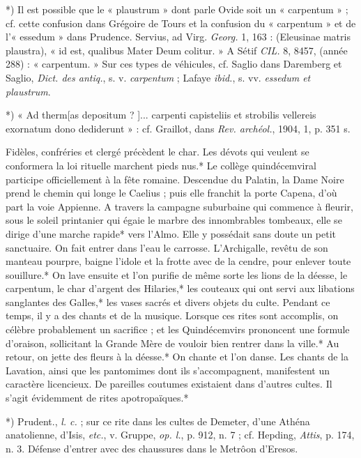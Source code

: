 \documentclass[a4paper, 11pt, oneside, polutonikogreek, french]{article}
\begin{document}
*) Il est possible que le « plaustrum » dont parle Ovide soit un « carpentum » ; cf. cette confusion dans Grégoire de Tours et la confusion du « carpentum » et de l'« essedum » dans Prudence. Servius, ad Virg. \emph{Georg.} 1, 163 : (Eleusinae matris plaustra), « id est, qualibus Mater Deum colitur. » A Sétif \emph{CIL.} 8, 8457, (année 288) : « carpentum. » Sur ces types de véhicules, cf. Saglio dans Daremberg et Saglio, \emph{Dict. des antiq.}, s. v. \emph{carpentum} ; Lafaye \emph{ibid.}, s. vv. \emph{essedum et plaustrum}.

*) « Ad therm[as depositum ? ]... carpenti capisteliis et strobilis vellereis exornatum dono dediderunt » : cf. Graillot, dans \emph{Rev. archéol.}, 1904, 1, p. 351 s.

Fidèles, confréries et clergé précèdent le char. Les dévots qui veulent se conformera la loi rituelle marchent pieds nus.* Le collège quindécemviral participe officiellement à la fête romaine. Descendue du Palatin, la Dame Noire prend le chemin qui longe le Caelius ; puis elle franchit la porte Capena, d'où part la voie Appienne. A travers la campagne suburbaine qui commence à fleurir, sous le soleil printanier qui égaie le marbre des innombrables tombeaux, elle se dirige d'une marche rapide* vers l'Almo. Elle y possédait sans doute un petit sanctuaire. On fait entrer dans l'eau le carrosse. L'Archigalle, revêtu de son manteau pourpre, baigne l'idole et la frotte avec de la cendre, pour enlever toute souillure.* On lave ensuite et l'on purifie de même sorte les lions de la déesse, le carpentum, le char d'argent des Hilaries,* les couteaux qui ont servi aux libations sanglantes des Galles,* les vases sacrés et divers objets du culte. Pendant ce temps, il y a des chants et de la musique. Lorsque ces rites sont accomplis, on célèbre probablement un sacrifice ; et les Quindécemvirs prononcent une formule d'oraison, sollicitant la Grande Mère de vouloir bien rentrer dans la ville.* Au retour, on jette des fleurs à la déesse.* On chante et l'on danse. Les chants de la Lavation, ainsi que les pantomimes dont ils s'accompagnent, manifestent un caractère licencieux. De pareilles coutumes existaient dans d'autres cultes. Il s'agit évidemment de rites apotropaïques.*

*) Prudent., \emph{l. c.} ; sur ce rite dans les cultes de Demeter, d'une Athéna anatolienne, d'Isis, \emph{etc.}, v. Gruppe, \emph{op. l.}, p. 912, n. 7 ; cf. Hepding, \emph{Attis}, p. 174, n. 3. Défense d'entrer avec des chaussures dans le Metrôon d'Eresos.
\end{document}
